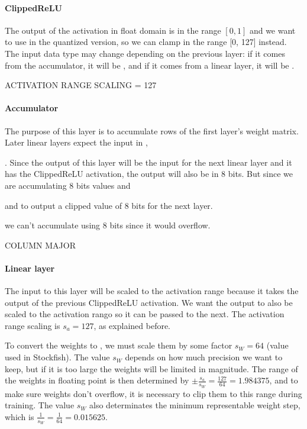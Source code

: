 \paragraph[short]{ClippedReLU} The output of the activation in float domain is in the range $[0, 1]$ and we want to use  in the quantized version, so we can clamp in the range [0, 127] instead. The input data type may change depending on the previous layer: if it comes from the accumulator, it will be , and if it comes from a linear layer, it will be .

ACTIVATION RANGE SCALING = 127


\paragraph[short]{Accumulator} The purpose of this layer is to accumulate rows of the first layer's weight matrix. Later linear layers expect the input in , 


. Since the output of this layer will be the input for the next linear layer and it has the ClippedReLU activation, the output will also be in 8 bits.
But since we are accumulating 8 bits values and


and to output a clipped value of 8 bits for the next layer.

we can't accumulate using 8 bits since it would overflow.

COLUMN MAJOR

\paragraph[short]{Linear layer}
The input to this layer will be scaled to the activation range because it takes the output of the previous ClippedReLU activation. We want the output to also be scaled to the activation rango so it can be passed to the next. The activation range scaling is $s_a=127$, as explained before.

To convert the weights to , we must scale them by some factor $s_W=64$ (value used in Stockfish). The value $s_W$ depends on how much precision we want to keep, but if it is too large the weights will be limited in magnitude. The range of the weights in floating point is then determined by $\pm \frac{s_a}{s_W}=\frac{127}{64}=1.984375$, and to make sure weights don't overflow, it is necessary to clip them to this range during training. The value $s_W$ also determinates the minimum representable weight step, which is $\frac{1}{s_W}=\frac{1}{64}=0.015625$.

